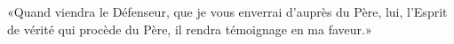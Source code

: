 \encetemps \jesusdisciples
	«Quand viendra le Défenseur, que je vous enverrai d’auprès du Père,
	lui, l’Esprit de vérité qui procède du Père,
	il rendra témoignage en ma faveur.»

